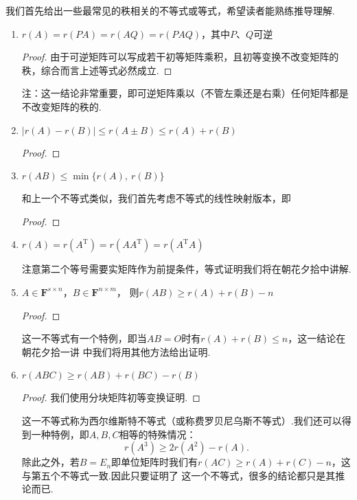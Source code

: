 我们首先给出一些最常见的秩相关的不等式或等式，希望读者能熟练推导理解.
\begin{enumerate}
    \item $r(A)=r(PA)=r(AQ)=r(PAQ)$，其中$P$、$Q$可逆
    
    \begin{proof}
        由于可逆矩阵可以写成若干初等矩阵乘积，且初等变换不改变矩阵的秩，综合而言上述等式必然成立.
    \end{proof}

    注：这一结论非常重要，即可逆矩阵乘以（不管左乘还是右乘）任何矩阵都是不改变矩阵的秩的.

    \item $|r(A)-r(B)|\leqslant r(A\pm B) \leqslant r(A)+r(B)$
    
    \begin{proof}
        
    \end{proof}
    \item $r(AB) \leqslant \min\{r(A),\ r(B)\}$
    
    和上一个不等式类似，我们首先考虑不等式的线性映射版本，即

    \begin{proof}
        
    \end{proof}
    \item $r(A)=r(A^\mathrm{T})=r(AA^\mathrm{T})=r(A^\mathrm{T}A)$
    
    注意第二个等号需要实矩阵作为前提条件，等式证明我们将在朝花夕拾中讲解.

    \item $A \in \mathbf{F}^{s \times n}$，$B \in \mathbf{F}^{n \times m}$，
    则$r(AB) \geqslant r(A)+r(B)-n$
    
    \begin{proof}
        
    \end{proof}

    这一不等式有一个特例，即当$AB=O$时有$r(A)+r(B)\leqslant n$，这一结论在朝花夕拾一讲
    中我们将用其他方法给出证明.

    \item $r(ABC) \geqslant r(AB)+r(BC)-r(B)$
    
    \begin{proof}
        我们使用分块矩阵初等变换证明.
    \end{proof}

    这一不等式称为西尔维斯特不等式（或称费罗贝尼乌斯不等式）.我们还可以得到一种特例，即$A,B,C$相等的特殊情况：
    \[r(A^3) \geqslant 2r(A^2)-r(A).\]
    除此之外，若$B=E_n$即单位矩阵时我们有$r(AC) \geqslant r(A)+r(C)-n$，这与第五个不等式一致.因此只要证明了
    这一个不等式，很多的结论都只是其推论而已.
\end{enumerate}

